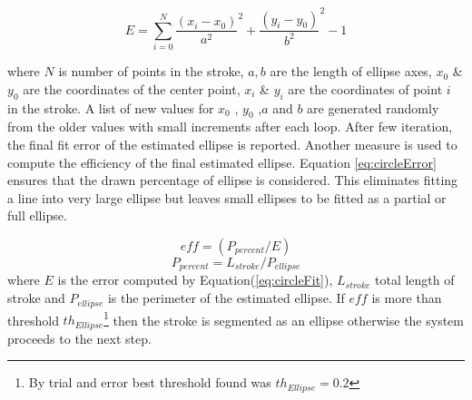 \documentclass{article}
\begin{document}
\begin{equation}
E = \sum\limits_{i = 0}^N {\frac{{(x_i - x_0 )}}{{a^2 }}^2  + \frac{{(y_i - y_0 )}}{{b^2 }}^2  - 1} 
\label{eq:circleFit}
\end{equation}

 where $N$ is number of points in the stroke, $a,b$ are the length of ellipse axes, $x_0$ \& $y_0$ are the coordinates of the center point, $x_i$ \& $y_i$ are the coordinates of point $i$ in the stroke. A list of new values for $x_0$ , $y_0$ ,$a$ and $b$ are generated randomly from the older values with small increments after each loop.  After few iteration, the final fit error of the estimated ellipse is reported. Another measure is used to compute the efficiency of the final estimated ellipse. Equation \ref{eq:circleError} ensures that the drawn percentage of ellipse is considered. This eliminates fitting a  line into very large ellipse but leaves small ellipses to be fitted as a partial or full ellipse. 

 \begin{equation}
eff= (P_{percent}/E)
\label{eq:circleError}
\end{equation}
 \begin{equation}
P_{percent}  = L_{stroke} /P_{ellipse} 
\label{eq:ErrorArea}
\end{equation}
where $E$ is the error computed by Equation(\ref{eq:circleFit}), $L_{stroke}$ total length of stroke and $P_{ellipse} $ is the perimeter of the estimated ellipse. If $eff$ is more than threshold $th_{Ellipse}$\footnote{By trial and error best threshold found was $th_{Ellipse}=0.2$} then the stroke is segmented as an ellipse otherwise the system proceeds to the next step. 
\end{document}
